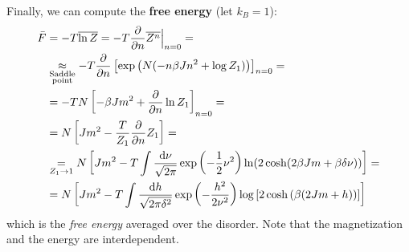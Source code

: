 \documentclass[../template.tex]{subfiles}
\begin{document}
Finally, we can compute the \textbf{free energy} (let $k_B = 1$):
\begin{align*}
    \bar{F} &= -T \overline{\ln Z} = -T \pdv{n} \overline{Z^n} \Big|_{n=0} =\\
    &\underset{\substack{\text{Saddle}\\\text{point}}}{\approx}  -T \pdv{n} \left[\exp\left(N (-n \beta J n^2 + \log Z_1)\right)\right]_{n=0} = \\
    &= -T N \left[- \beta J m^2 + \pdv{n} \ln Z_1\right]_{n=0} =\\ 
     &= N \left[J m^2 - \frac{T}{Z_1} \pdv{n} Z_1 \right] = \\
     &\underset{Z_1 \to 1}{=}  N\left[J m^2 - T\int \frac{\dd{\nu}}{\sqrt{2 \pi}} \exp\left(-\frac{1}{2} \nu^2 \right) \ln(2 \cosh (2 \beta J m + \beta \delta \nu)) \right] = \\
     &= N\left[J m^2 - T \int \frac{\dd{h}}{\sqrt{2 \pi \delta^2 }} \exp\left(-\frac{h^2}{2 \nu^2} \right) \log \left[2 \cosh \left(\beta (2 Jm+ h)\right)\right] \right]
\end{align*} 
which is the \textit{free energy} averaged over the disorder. Note that the magnetization and the energy are interdependent.  
\end{document}
